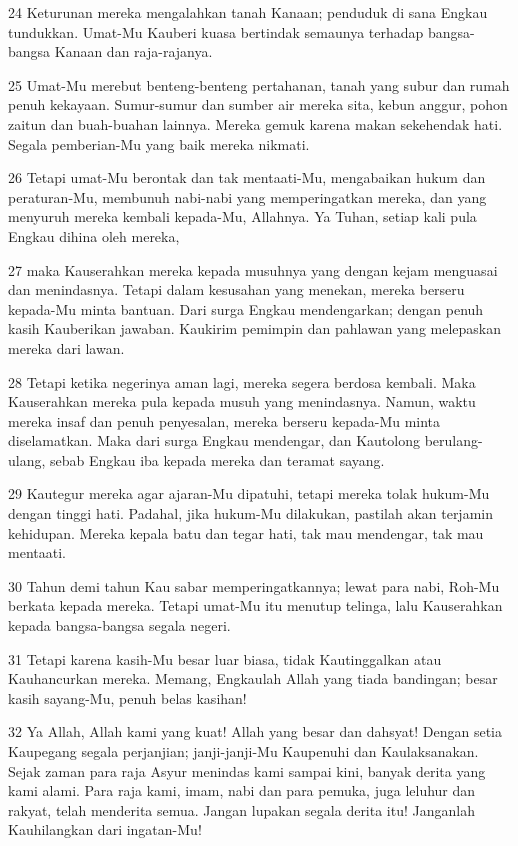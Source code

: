 \par 24 Keturunan mereka mengalahkan tanah Kanaan; penduduk di sana Engkau tundukkan. Umat-Mu Kauberi kuasa bertindak semaunya terhadap bangsa-bangsa Kanaan dan raja-rajanya.
\par 25 Umat-Mu merebut benteng-benteng pertahanan, tanah yang subur dan rumah penuh kekayaan. Sumur-sumur dan sumber air mereka sita, kebun anggur, pohon zaitun dan buah-buahan lainnya. Mereka gemuk karena makan sekehendak hati. Segala pemberian-Mu yang baik mereka nikmati.
\par 26 Tetapi umat-Mu berontak dan tak mentaati-Mu, mengabaikan hukum dan peraturan-Mu, membunuh nabi-nabi yang memperingatkan mereka, dan yang menyuruh mereka kembali kepada-Mu, Allahnya. Ya Tuhan, setiap kali pula Engkau dihina oleh mereka,
\par 27 maka Kauserahkan mereka kepada musuhnya yang dengan kejam menguasai dan menindasnya. Tetapi dalam kesusahan yang menekan, mereka berseru kepada-Mu minta bantuan. Dari surga Engkau mendengarkan; dengan penuh kasih Kauberikan jawaban. Kaukirim pemimpin dan pahlawan yang melepaskan mereka dari lawan.
\par 28 Tetapi ketika negerinya aman lagi, mereka segera berdosa kembali. Maka Kauserahkan mereka pula kepada musuh yang menindasnya. Namun, waktu mereka insaf dan penuh penyesalan, mereka berseru kepada-Mu minta diselamatkan. Maka dari surga Engkau mendengar, dan Kautolong berulang-ulang, sebab Engkau iba kepada mereka dan teramat sayang.
\par 29 Kautegur mereka agar ajaran-Mu dipatuhi, tetapi mereka tolak hukum-Mu dengan tinggi hati. Padahal, jika hukum-Mu dilakukan, pastilah akan terjamin kehidupan. Mereka kepala batu dan tegar hati, tak mau mendengar, tak mau mentaati.
\par 30 Tahun demi tahun Kau sabar memperingatkannya; lewat para nabi, Roh-Mu berkata kepada mereka. Tetapi umat-Mu itu menutup telinga, lalu Kauserahkan kepada bangsa-bangsa segala negeri.
\par 31 Tetapi karena kasih-Mu besar luar biasa, tidak Kautinggalkan atau Kauhancurkan mereka. Memang, Engkaulah Allah yang tiada bandingan; besar kasih sayang-Mu, penuh belas kasihan!
\par 32 Ya Allah, Allah kami yang kuat! Allah yang besar dan dahsyat! Dengan setia Kaupegang segala perjanjian; janji-janji-Mu Kaupenuhi dan Kaulaksanakan. Sejak zaman para raja Asyur menindas kami sampai kini, banyak derita yang kami alami. Para raja kami, imam, nabi dan para pemuka, juga leluhur dan rakyat, telah menderita semua. Jangan lupakan segala derita itu! Janganlah Kauhilangkan dari ingatan-Mu!
